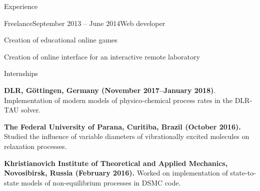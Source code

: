 \documentclass{resume} %
\begin{document}
\begin{rSection}{Experience}
\begin{rSubsection}{Freelance}{September 2013 -- June 2014}{Web developer}{}
\item Creation of educational online games
\item Creation of online interface for an interactive remote laboratory
\end{rSubsection}

\begin{rSubsection}{Internships}{}{}{}
\item \textbf{DLR, Göttingen, Germany (November 2017--January 2018)}.
Implementation of modern models of physico-chemical process rates in the DLR-TAU solver.

\item \textbf{The Federal University of Parana, Curitiba, Brazil (October 2016).}
Studied the influence of variable diameters of vibrationally excited molecules on relaxation processes.

\item \textbf{Khristianovich Institute of Theoretical and Applied Mechanics, Novosibirsk, Russia (February 2016).}
Worked on implementation of state-to-state models of non-equilibrium processes in DSMC code.
\end{rSubsection}





\end{rSection}
\end{document}
